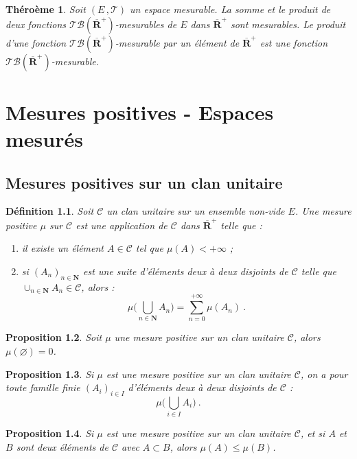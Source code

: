 \documentclass{scrreport}
\theoremstyle{def}
\newtheorem{definition}{Définition}
\theoremstyle{thm}
\newtheorem{theorem}[definition]{Théroème}
\theoremstyle{prop}
\newtheorem{proposition}[definition]{Proposition}
\theoremstyle{rem}
\numberwithin{definition}{section}
\numberwithin{lemma}{section}
\numberwithin{proposition}{section}
\numberwithin{theorem}{section}
\numberwithin{corol}{section}
\numberwithin{notation}{section}
\numberwithin{example}{section}
\numberwithin{exercise}{section}
\numberwithin{remark}{section}
\newcommand{\OO}{\varnothing}
\newcommand{\N}{\mathbf{N}}
\newcommand{\R}{\mathbf{R}}
\newcommand{\RR}{\overline{\R}}
\newcommand{\scrB}{\mathscr{B}}
\newcommand{\scrC}{\mathscr{C}}
\newcommand{\scrT}{\mathscr{T}}
\begin{document}
\begin{theorem}\label{thm1:5:21}
	Soit \((E\,, \scrT)\) un espace mesurable. La somme et le produit de deux fonctions \(\scrT \scrB(\RR^+)\)-mesurables de \(E\) dans \(\RR^+\) sont mesurables. Le produit d'une fonction \(\scrT \scrB(\RR^+)\)-mesurable par un élément de \(\RR^+\) est une fonction \(\scrT \scrB(\RR^+)\)-mesurable.
\end{theorem}

\chapter{Mesures positives - Espaces mesurés}

\section{Mesures positives sur un clan unitaire}

\begin{definition}\label{def2:1:1}
	Soit \(\scrC\) un clan unitaire sur un ensemble non-vide \(E\). Une mesure positive \(\mu\) sur \(\scrC\) est une application de \(\scrC\) dans \(\RR^+\) telle que :
	\begin{enumerate}
		\item il existe un élément \(A \in \scrC\) tel que \(\mu(A) < +\infty\) ;
		\item si \({(A_n)}_{n \in \N}\) est une suite d'éléments deux à deux disjoints de \(\scrC\) telle que \(\cup_{n \in \N} A_n \in \scrC\), alors :
		\[ \mu \Biggl( \bigcup_{n \in \N} A_n \Biggr) = \sum_{n = 0}^{+\infty} \mu(A_n) \: \text{.} \]
	\end{enumerate}
\end{definition}

\begin{proposition}\label{prop2:1:2}
	Soit \(\mu\) une mesure positive sur un clan unitaire \(\scrC\), alors \(\mu(\OO) = 0\).
\end{proposition}

\begin{proposition}\label{prop2:1:3}
	Si \(\mu\) est une mesure positive sur un clan unitaire \(\scrC\), on a pour toute famille finie \({(A_i)}_{i \in I}\) d'éléments deux à deux disjoints de \(\scrC\) :
	\[ \mu \Biggl( \bigcup_{i \in I} A_i \Biggr) \: \text{.} \]
\end{proposition}

\begin{proposition}\label{prop2:1:4}
	Si \(\mu\) est une mesure positive sur un clan unitaire \(\scrC\), et si \(A\) et \(B\) sont deux éléments de \(\scrC\) avec \(A \subset B\), alors \(\mu(A) \leqslant \mu(B)\).
\end{proposition}
\end{document}
